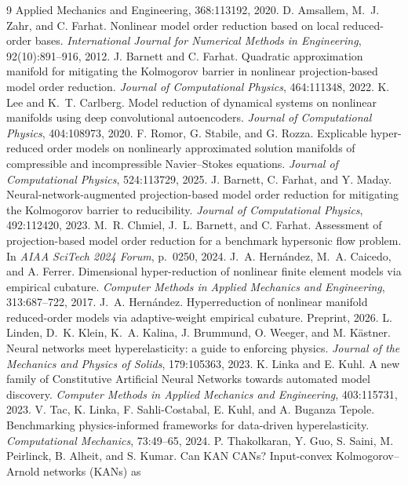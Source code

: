 \documentclass[10pt,a4paper]{article}
\begin{document}
\begin{thebibliography}{9}
{Applied Mechanics and Engineering}, 368:113192, 2020.
D. Amsallem, M.~J. Zahr, and C. Farhat. Nonlinear model order
reduction based on local reduced-order bases. \emph{International
Journal for Numerical Methods in Engineering}, 92(10):891--916, 2012.
J. Barnett and C. Farhat. Quadratic approximation manifold for
mitigating the Kolmogorov barrier in nonlinear projection-based model
order reduction. \emph{Journal of Computational Physics}, 464:111348,
2022.
K. Lee and K.~T. Carlberg. Model reduction of dynamical systems on
nonlinear manifolds using deep convolutional autoencoders.
\emph{Journal of Computational Physics}, 404:108973, 2020.
F. Romor, G. Stabile, and G. Rozza. Explicable hyper-reduced order
models on nonlinearly approximated solution manifolds of compressible
and incompressible Navier--Stokes equations. \emph{Journal of
Computational Physics}, 524:113729, 2025.
J. Barnett, C. Farhat, and Y. Maday. Neural-network-augmented
projection-based model order reduction for mitigating the Kolmogorov
barrier to reducibility. \emph{Journal of Computational Physics},
492:112420, 2023.
M.~R. Chmiel, J.~L. Barnett, and C. Farhat. Assessment of
projection-based model order reduction for a benchmark hypersonic flow
problem. In \emph{AIAA SciTech 2024 Forum}, p.~0250, 2024.
J.~A. Hern\'andez, M.~A. Caicedo, and A. Ferrer. Dimensional
hyper-reduction of nonlinear finite element models via empirical
cubature. \emph{Computer Methods in Applied Mechanics and
Engineering}, 313:687--722, 2017.
J.~A. Hern\'andez. Hyperreduction of nonlinear manifold reduced-order
models via adaptive-weight empirical cubature. Preprint, 2026.
L. Linden, D.~K. Klein, K.~A. Kalina, J. Brummund, O. Weeger, and
M. K\"astner. Neural networks meet hyperelasticity: a guide to enforcing
physics. \emph{Journal of the Mechanics and Physics of Solids},
179:105363, 2023.
K. Linka and E. Kuhl. A new family of Constitutive Artificial Neural
Networks towards automated model discovery.
\emph{Computer Methods in Applied Mechanics and Engineering}, 403:115731,
2023.
V. Tac, K. Linka, F. Sahli-Costabal, E. Kuhl, and A. Buganza Tepole.
Benchmarking physics-informed frameworks for data-driven
hyperelasticity. \emph{Computational Mechanics}, 73:49--65, 2024.
P. Thakolkaran, Y. Guo, S. Saini, M. Peirlinck, B. Alheit, and S. Kumar.
Can KAN CANs? Input-convex Kolmogorov--Arnold networks (KANs) as

\end{thebibliography}
\end{document}
